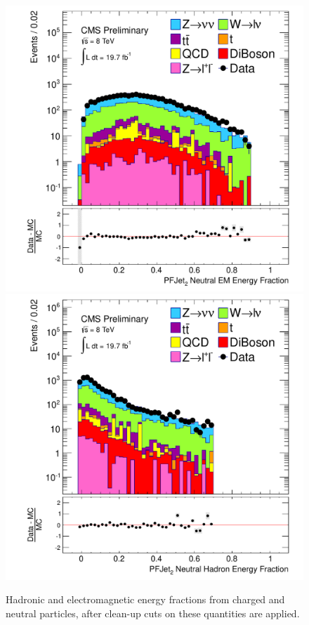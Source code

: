 \begin{figure}[!Hhtb]
\begin{center}
  \includegraphics[scale=0.31]     {Figures/sus13009/nocut/prelimLabels/cut/PFAK5JetNeuEmEngFrac2.pdf}
  \includegraphics[scale=0.31]     {Figures/sus13009/nocut/prelimLabels/cut/PFAK5JetNeuHadEngFrac2.pdf}
  \caption{Hadronic and electromagnetic energy fractions from charged 
and neutral particles, after clean-up cuts on these quantities are 
applied.}
         \label{fig:ANA_energy_fraction_cleanup_cut}
  \end{center}
\end{figure}


